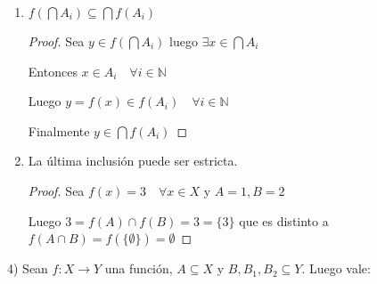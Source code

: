 \documentclass[12pt]{article}
\newcommand{\N}{\mathbb{N}}
\newcommand{\ra}{\rightarrow}
\theoremstyle{definition}
\begin{document}
\begin{enumerate}[i.]
\begin{enumerate}
      \item $f(\bigcap A_{i}) \subseteq \bigcap f(A_{i})$
	\begin{proof}
	
	Sea $y \in f(\bigcap A_{i})$ luego $\exists x \in \bigcap A_{i}$

	Entonces $x \in A_{i} \quad \forall i \in \N$

	Luego $y = f(x) \in f(A_{i}) \quad \forall i \in \N$ 

	Finalmente $y \in \bigcap f(A_{i})$

        \end{proof}

      \item La última inclusión puede ser estricta. 
	\begin{proof}

	Sea $f(x) = 3 \quad \forall x \in X$ y $A = {1}, B={2}$

	Luego $3 = f(A) \cap f(B) = 3 = \{3\} $ que es distinto a $f(A \cap B) = f(\{\emptyset\}) = \emptyset$

        \end{proof}

     \end{enumerate}
\end{enumerate}

4) Sean $f: X \ra Y$ una función, $A \subseteq X$ y $B,B_{1},B_{2} \subseteq Y.$ Luego vale:
\end{document}
